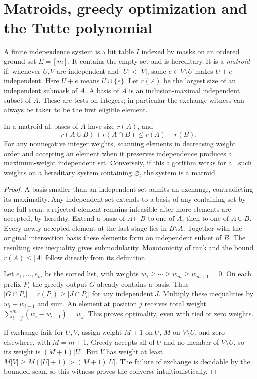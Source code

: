 \section{Matroids, greedy optimization and the Tutte polynomial}
\label{sec:matroid}
A finite independence system is a bit table $I$ indexed by masks on an ordered ground set $E=[m]$. It contains the empty set and is hereditary. It is a \emph{matroid} if, whenever $U,V$ are independent and $|U|<|V|$, some $e\in V\setminus U$ makes $U+e$ independent. Here $U+e$ means $U\cup\{e\}$. Let $r(A)$ be the largest size of an independent submask of $A$. A basis of $A$ is an inclusion-maximal independent subset of $A$. These are tests on integers; in particular the exchange witness can always be taken to be the first eligible element.

\begin{theorem}\label{result50}
In a matroid all bases of $A$ have size $r(A)$, and
\[
  r(A\cup B)+r(A\cap B)\le r(A)+r(B).
\]
For any nonnegative integer weights, scanning elements in decreasing weight order and accepting an element when it preserves independence produces a maximum-weight independent set. Conversely, if this algorithm works for all such weights on a hereditary system containing $\varnothing$, the system is a matroid.
\end{theorem}
\begin{proof}
A basis smaller than an independent set admits an exchange, contradicting its maximality. Any independent set extends to a basis of any containing set by one full scan: a rejected element remains infeasible after more elements are accepted, by heredity. Extend a basis of $A\cap B$ to one of $A$, then to one of $A\cup B$. Every newly accepted element at the last stage lies in $B\setminus A$. Together with the original intersection basis these elements form an independent subset of $B$. The resulting size inequality gives submodularity. Monotonicity of rank and the bound $r(A)\le |A|$ follow directly from its definition.

Let $e_1,\ldots,e_m$ be the sorted list, with weights $w_1\ge\cdots\ge w_m\ge w_{m+1}=0$. On each prefix $P_i$ the greedy output $G$ already contains a basis. Thus $|G\cap P_i|=r(P_i)\ge|J\cap P_i|$ for any independent $J$. Multiply these inequalities by $w_i-w_{i+1}$ and sum. An element at position $j$ receives total weight $\sum_{i=j}^m(w_i-w_{i+1})=w_j$. This proves optimality, even with tied or zero weights.

If exchange fails for $U,V$, assign weight $M+1$ on $U$, $M$ on $V\setminus U$, and zero elsewhere, with $M=m+1$. Greedy accepts all of $U$ and no member of $V\setminus U$, so its weight is $(M+1)|U|$. But $V$ has weight at least $M|V|\ge M(|U|+1)>(M+1)|U|$. The failure of exchange is decidable by the bounded scan, so this witness proves the converse intuitionistically.
\end{proof}

